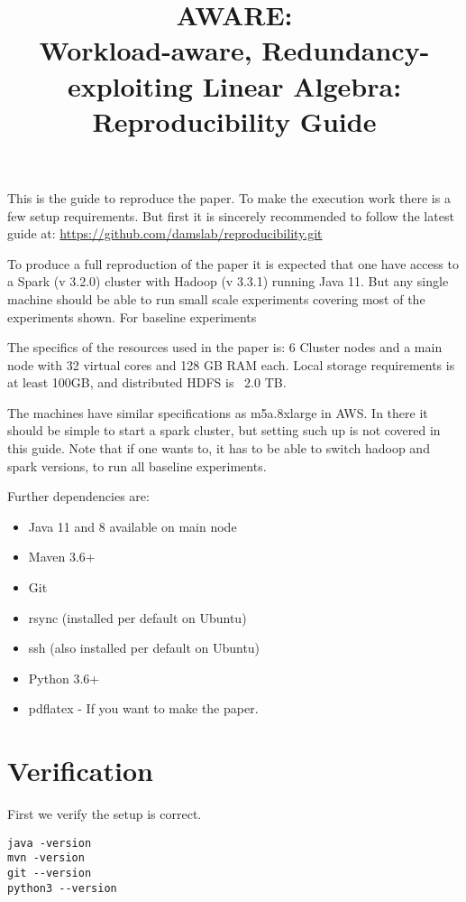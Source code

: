 \documentclass{readme}
\title{AWARE: \\ Workload-aware, Redundancy-exploiting Linear Algebra: \\ Reproducibility Guide}
\begin{document}
\maketitle

This is the guide to reproduce the paper.
To make the execution work there is a few setup requirements.
But first it is sincerely recommended to follow the latest guide at: 
\url{https://github.com/damslab/reproducibility.git}

To produce a full reproduction of the paper it is expected that one have access to a Spark (v 3.2.0) cluster with Hadoop (v 3.3.1) running Java 11. But any single machine should be able to run small scale experiments covering most of the experiments shown. For baseline experiments

The specifics of the resources used in the paper is: 6 Cluster nodes and a main node with 32 virtual cores and 128 GB RAM each. Local storage requirements is at least 100GB, and distributed HDFS is ~2.0 TB.

The machines have similar specifications as m5a.8xlarge in AWS. In there it should be simple to start a spark cluster, but setting such up is not covered in this guide.
Note that if one wants to, it has to be able to switch hadoop and spark versions, to run all baseline experiments.

Further dependencies are:

\begin{itemize}
    \item Java 11 and 8 available on main node
    \item Maven 3.6+
    \item Git
    \item rsync (installed per default on Ubuntu)
    \item ssh (also installed per default on Ubuntu)
    \item Python 3.6+
    \item pdflatex - If you want to make the paper.
\end{itemize}

\section{Verification}

First we verify the setup is correct.

\begin{lstlisting}
java -version
mvn -version
git --version
python3 --version
\end{lstlisting}
\end{document}

